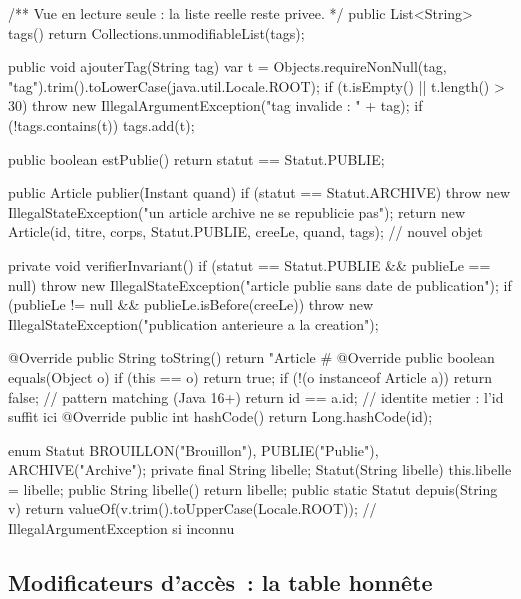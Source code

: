 \begin{codejava}
{    /** Vue en lecture seule : la liste reelle reste privee. */
    public List<String> tags() { return Collections.unmodifiableList(tags); }

    public void ajouterTag(String tag) {
        var t = Objects.requireNonNull(tag, "tag").trim().toLowerCase(java.util.Locale.ROOT);
        if (t.isEmpty() || t.length() > 30) { throw new IllegalArgumentException("tag invalide : " + tag); }
        if (!tags.contains(t)) { tags.add(t); }
    }

    public boolean estPublie() { return statut == Statut.PUBLIE; }

    public Article publier(Instant quand) {
        if (statut == Statut.ARCHIVE) { throw new IllegalStateException("un article archive ne se republicie pas"); }
        return new Article(id, titre, corps, Statut.PUBLIE, creeLe, quand, tags);  // nouvel objet
    }

    private void verifierInvariant() {
        if (statut == Statut.PUBLIE && publieLe == null) {
            throw new IllegalStateException("article publie sans date de publication");
        }
        if (publieLe != null && publieLe.isBefore(creeLe)) {
            throw new IllegalStateException("publication anterieure a la creation");
        }
    }

    @Override public String toString() {
        return "Article #%
    }
    @Override public boolean equals(Object o) {
        if (this == o) { return true; }
        if (!(o instanceof Article a)) { return false; }   // pattern matching (Java 16+)
        return id == a.id;                                  // identite metier : l'id suffit ici
    }
    @Override public int hashCode() { return Long.hashCode(id); }
}

enum Statut {
    BROUILLON("Brouillon"), PUBLIE("Publie"), ARCHIVE("Archive");
    private final String libelle;
    Statut(String libelle) { this.libelle = libelle; }
    public String libelle() { return libelle; }
    public static Statut depuis(String v) {
        return valueOf(v.trim().toUpperCase(Locale.ROOT));      // IllegalArgumentException si inconnu
    }
}
\end{codejava}

\subsection{Modificateurs d'acc\`es~: la table honn\^ete}

